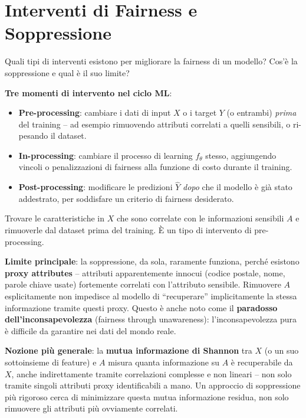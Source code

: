 \documentclass[a4paper,11pt]{article}
\begin{document}
\section{Interventi di Fairness e Soppressione}

\begin{domanda}
Quali tipi di interventi esistono per migliorare la fairness di un modello? Cos'\`{e} la soppressione e qual \`{e} il suo limite?
\end{domanda}

\textbf{Tre momenti di intervento nel ciclo ML}:
\begin{itemize}
  \item \textbf{Pre-processing}: cambiare i dati di input $X$ o i target $Y$ (o entrambi) \emph{prima} del training -- ad esempio rimuovendo attributi correlati a quelli sensibili, o ri-pesando il dataset.
  \item \textbf{In-processing}: cambiare il processo di learning $f_\theta$ stesso, aggiungendo vincoli o penalizzazioni di fairness alla funzione di costo durante il training.
  \item \textbf{Post-processing}: modificare le predizioni $\hat{Y}$ \emph{dopo} che il modello \`{e} gi\`{a} stato addestrato, per soddisfare un criterio di fairness desiderato.
\end{itemize}

\begin{definizione}
Trovare le caratteristiche in $X$ che sono correlate con le informazioni sensibili $A$ e rimuoverle dal dataset prima del training. \`{E} un tipo di intervento di pre-processing.
\end{definizione}

\textbf{Limite principale}: la soppressione, da sola, raramente funziona, perch\'{e} esistono \textbf{proxy attributes} -- attributi apparentemente innocui (codice postale, nome, parole chiave usate) fortemente correlati con l'attributo sensibile. Rimuovere $A$ esplicitamente non impedisce al modello di ``recuperare'' implicitamente la stessa informazione tramite questi proxy. Questo \`{e} anche noto come il \textbf{paradosso dell'inconsapevolezza} (fairness through unawareness): l'inconsapevolezza pura \`{e} difficile da garantire nei dati del mondo reale.

\textbf{Nozione pi\`{u} generale}: la \textbf{mutua informazione di Shannon} tra $X$ (o un suo sottoinsieme di feature) e $A$ misura quanta informazione su $A$ \`{e} recuperabile da $X$, anche indirettamente tramite correlazioni complesse e non lineari -- non solo tramite singoli attributi proxy identificabili a mano. Un approccio di soppressione pi\`{u} rigoroso cerca di minimizzare questa mutua informazione residua, non solo rimuovere gli attributi pi\`{u} ovviamente correlati.
\end{document}
